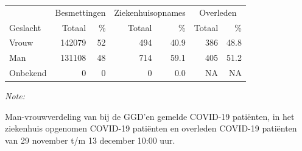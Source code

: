 \documentclass[
  english,
  man,floatsintext]{apa6}
\begin{document}
\newpage

\begin{table}
\centering\begingroup\fontsize{11}{13}\selectfont

\begin{threeparttable}
\begin{tabular}{lrrrrrr}
\toprule
\multicolumn{1}{c}{ } & \multicolumn{2}{c}{Besmettingen} & \multicolumn{2}{c}{Ziekenhuisopnames} & \multicolumn{2}{c}{Overleden} \\
\cmidrule(l{3pt}r{3pt}){2-3} \cmidrule(l{3pt}r{3pt}){4-5} \cmidrule(l{3pt}r{3pt}){6-7}
Geslacht & Totaal & \% & Totaal & \% & Totaal & \%\\
\midrule
Vrouw & 142079 & 52 & 494 & 40.9 & 386 & 48.8\\
Man & 131108 & 48 & 714 & 59.1 & 405 & 51.2\\
Onbekend & 0 & 0 & 0 & 0.0 & NA & NA\\
\bottomrule
\end{tabular}
\begin{tablenotes}
\item \textit{Note: } 
\item Man-vrouwverdeling van bij de GGD’en gemelde COVID-19 patiënten, in het ziekenhuis opgenomen COVID-19 patiënten en overleden COVID-19 patiënten van 29 november t/m 13 december 10:00 uur.
\end{tablenotes}
\end{threeparttable}
\endgroup{}
\end{table}
\newpage
\end{document}
